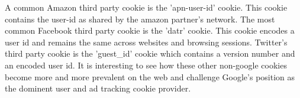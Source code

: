 A common Amazon third party cookie is the 'apn-user-id' cookie. This cookie contains the user-id as shared by the amazon partner's network. The most common Facebook third party cookie is the 'datr' cookie. This cookie encodes a user id and remains the same across websites and browsing sessions. Twitter's third party cookie is the 'guest\_id' cookie which contains a version number and an encoded user id. It is interesting to see how these other non-google cookies become more and more prevalent on the web and challenge Google's position as the dominent user and ad tracking cookie provider.





